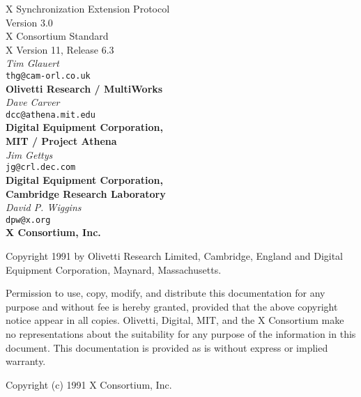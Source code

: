 \begin{center}

{\large X Synchronization Extension Protocol}\\[10pt]
{\large Version 3.0}\\[15pt]
{\large X Consortium Standard}\\[15pt]
{\large X Version 11, Release 6.3}\\[15pt]
{\it Tim Glauert}\\[0pt]
{\tt thg@cam-orl.co.uk}\\[0pt]
{\bf Olivetti Research / MultiWorks}\\[5pt]
{\it Dave Carver}\\[0pt]
{\tt dcc@athena.mit.edu}\\[0pt]
{\bf Digital Equipment Corporation,}\\[0pt]
{\bf MIT / Project Athena}\\[5pt]
{\it Jim Gettys}\\[0pt]
{\tt jg@crl.dec.com}\\[0pt]
{\bf Digital Equipment Corporation,}\\[0pt]
{\bf Cambridge Research Laboratory}\\[5pt]
{\it David P. Wiggins}\\[0pt]
{\tt dpw@x.org}\\[0pt]
{\bf X Consortium, Inc.}\\[0pt]

\end {center}

Copyright 1991 by Olivetti Research Limited, Cambridge, England and
Digital Equipment Corporation, Maynard, Massachusetts.

{\small Permission to use, copy, modify, and distribute this documentation
for any purpose and without fee is hereby granted, provided that the above
copyright notice appear in all copies. Olivetti, Digital, MIT, and the
X Consortium
make no representations about the suitability for any purpose of the
information in this document. This documentation is provided as is without
express or implied warranty.}

Copyright (c) 1991 X Consortium, Inc.

